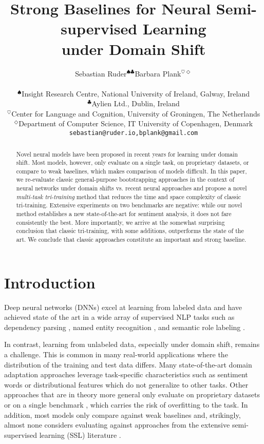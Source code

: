 \documentclass[11pt,a4paper]{article}
\title{Strong Baselines for Neural Semi-supervised Learning\\under Domain Shift}
\author
{
	\begin{tabular}{cc}
	Sebastian Ruder$^{\spadesuit\clubsuit}$ & Barbara Plank$^{\heartsuit\Diamond}$ \\
	\end{tabular}
	\\
    $^\spadesuit$Insight Research Centre, National University of Ireland, Galway, Ireland\\
    $^\clubsuit$Aylien Ltd., Dublin, Ireland\\
    $^\heartsuit$Center for Language and Cognition, University of Groningen, The Netherlands\\
    $^\Diamond$Department of Computer Science, IT University of Copenhagen, Denmark\\
	{\tt \small{sebastian@ruder.io,bplank@gmail.com}}
}
\date{}
\begin{document}
\maketitle
\begin{abstract}
Novel neural models have been proposed in recent years for learning under domain shift. Most models, however, only evaluate on a single task, on proprietary datasets, or compare to weak baselines, which makes comparison of models difficult. 
In this paper, we re-evaluate classic general-purpose bootstrapping approaches in the context of neural networks under domain shifts vs. recent neural approaches
and propose a novel \emph{multi-task tri-training} method that reduces the time and space complexity of classic tri-training.
Extensive experiments on two benchmarks 
are negative: while our novel method establishes a new state-of-the-art for sentiment analysis, it does not fare consistently the best. More importantly, we arrive at the somewhat surprising conclusion that classic tri-training, with some additions, outperforms the state of the art. We conclude that classic approaches constitute an important and strong baseline.
\end{abstract}

\section{Introduction}

Deep neural networks (DNNs) excel at learning from labeled data and have achieved state of the art in a wide array of supervised NLP tasks such as dependency parsing \cite{Dozat2017}, named entity recognition \cite{Lample2016}, and semantic role labeling \cite{He2017}.

In contrast, learning from unlabeled data, especially under domain shift, remains a challenge. This is common in many real-world applications where the distribution of the training and test data differs. Many state-of-the-art domain adaptation approaches leverage task-specific characteristics such as sentiment words \cite{Blitzer2006,Wu2016a} or distributional features \cite{Schnabel2014,yin-schnabel-schutze:2015:EMNLP} which do not generalize to other tasks. Other approaches that are in theory more general only evaluate on proprietary datasets \cite{Kim2017b} or on a single benchmark \cite{Zhou2016}, which carries the risk of overfitting to the task. In addition, most models only compare against weak baselines and, strikingly, almost none considers evaluating against approaches from the extensive semi-supervised learning (SSL) literature \cite{Chapelle2006}.
\end{document}
